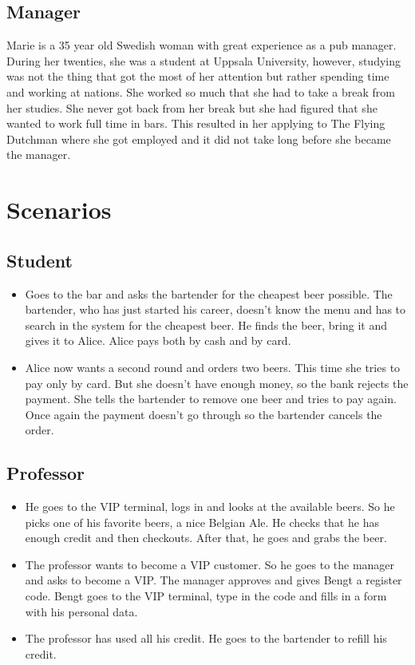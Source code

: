 \documentclass{article}
\begin{document}
\subsection{Manager}
Marie is a 35 year old Swedish woman with great experience as a pub manager. During her twenties, she was a student at Uppsala University, however, studying was not the thing that got the most of her attention but rather spending time and working at nations. She worked so much that she had to take a break from her studies. She never got back from her break but she had figured that she wanted to work full time in bars. This resulted in her applying to The Flying Dutchman where she got employed and it did not take long before she became the manager.
\section{Scenarios}
\label{sec:label}
\subsection{Student}
\begin{itemize}
\item Goes to the bar and asks the bartender for the cheapest beer possible. The bartender, who has just started his career, doesn’t know the menu and has to search in the system for the cheapest beer. He finds the beer, bring it and gives it to Alice. Alice pays both by cash and by card.
\item Alice now wants a second round and orders two beers. This time she tries to pay only by card. But she doesn’t have enough money, so the bank rejects the payment. She tells the bartender to remove one beer and tries to pay again. Once again the payment doesn’t go through so the bartender cancels the order.

\end{itemize}
\subsection{Professor}

\begin{itemize}
\item He goes to the VIP terminal, logs in and looks at the available beers. So he picks one of his favorite beers, a nice Belgian Ale. He checks that he has enough credit and then checkouts. After that, he goes and grabs the beer.
\item The professor wants to become a VIP customer. So he goes to the manager and asks to become a VIP. The manager approves and gives Bengt a register code. Bengt goes to the VIP terminal, type in the code and fills in a form with his personal data.
\item The professor has used all his credit. He goes to the bartender to refill his credit. 

\end{itemize}
\end{document}
